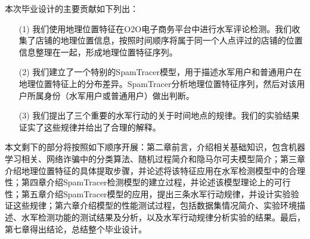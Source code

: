 本次毕业设计的主要贡献如下列出：

\begin{enumerate}
	\item[(1)] 我们使用地理位置特征在O2O电子商务平台中进行水军评论检测。我们收集了店铺的地理位置信息，按照时间顺序将属于同一个人点评过的店铺的位置信息整理在一起，形成地理位置特征序列。
	\item[(2)]  我们建立了一个特别的SpamTracer模型，用于描述水军用户和普通用户在地理位置特征上的分布差异。SpamTracer分析地理位置特征序列，然后对该用户所属身份（水军用户或普通用户）做出判断。
	\item[(3)]  我们提出了三个重要的水军行动的关于时间地点的规律。我们的实验结果证实了这些规律并给出了合理的解释。
\end{enumerate}

本文剩下的部分将按照如下顺序开展：第二章前言，介绍相关基础知识，包含机器学习相关、网络诈骗中的分类算法、随机过程简介和隐马尔可夫模型简介；第三章介绍地理位置特征的具体提取步骤，并论述将该特征应用在水军检测模型中的合理性；第四章介绍SpamTracer检测模型的建立过程，并论述该模型理论上的可行性；第五章介绍SpamTracer模型的应用，提出三条水军行动规律，并设计实验验证这些规律；第六章介绍模型的性能测试过程，包括数据集情况简介、实验环境描述、水军检测功能的测试结果及分析，以及水军行动规律分析实验的结果。最后，第七章得出结论，总结整个毕业设计。




